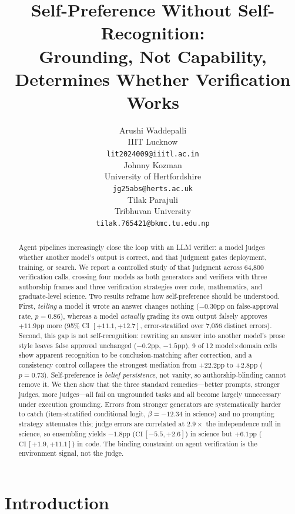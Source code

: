 \documentclass{article}
\title{Self-Preference Without Self-Recognition:\\
Grounding, Not Capability, Determines Whether Verification Works}
\author{
  Arushi Waddepalli \\
  IIIT Lucknow \\
  \texttt{lit2024009@iiitl.ac.in} \\
  \And
  Johnny Kozman \\
  University of Hertfordshire \\
  \texttt{jg25abs@herts.ac.uk} \\
  \And
  Tilak Parajuli \\
  Tribhuvan University \\
  \texttt{tilak.765421@bkmc.tu.edu.np} \\
}
\begin{document}
\maketitle


\begin{abstract}
  Agent pipelines increasingly close the loop with an LLM verifier: a model judges
whether another model's output is correct, and that judgment gates deployment,
training, or search. We report a controlled study of that judgment across
64{,}800 verification calls, crossing four models as both generators and
verifiers with three authorship frames and three verification strategies over
code, mathematics, and graduate-level science. Two results reframe how
self-preference should be understood. First, \emph{telling} a model it wrote an
answer changes nothing ($-0.30$pp on false-approval rate, $p{=}0.86$), whereas a
model \emph{actually} grading its own output falsely approves $+11.9$pp more
(95\% CI $[+11.1,+12.7]$, error-stratified over 7{,}056 distinct errors). Second,
this gap is not self-recognition: rewriting an answer into another model's prose
style leaves false approval unchanged ($-0.2$pp, $-1.5$pp), 9 of 12
model$\times$domain cells show apparent recognition to be conclusion-matching
after correction, and a consistency control collapses the strongest mediation
from $+22.2$pp to $+2.8$pp ($p{=}0.73$). Self-preference is \emph{belief
persistence}, not vanity, so authorship-blinding cannot remove it. We then show
that the three standard remedies---better prompts, stronger judges, more
judges---all fail on ungrounded tasks and all become largely unnecessary under
execution grounding. Errors from stronger generators are systematically harder to
catch (item-stratified conditional logit, $\beta{=}-12.34$ in science) and no
prompting strategy attenuates this; judge errors are correlated at $2.9\times$
the independence null in science, so ensembling yields $-1.8$pp
($\text{CI}\,[-5.5,+2.6]$) in science but $+6.1$pp ($\text{CI}\,[+1.9,+11.1]$) in
code. The binding constraint on agent verification is the environment signal, not
the judge.
\end{abstract}

\section{Introduction}
\label{Introduction}
\end{document}
